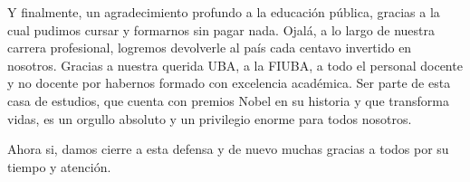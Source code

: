 Y finalmente, un agradecimiento profundo a la educación pública, gracias a la cual pudimos cursar y formarnos sin pagar nada. Ojalá, a lo largo de nuestra carrera profesional, logremos devolverle al país cada centavo invertido en nosotros. Gracias a nuestra querida UBA, a la FIUBA, a todo el personal docente y no docente por habernos formado con excelencia académica. Ser parte de esta casa de estudios, que cuenta con premios Nobel en su historia y que transforma vidas, es un orgullo absoluto y un privilegio enorme para todos nosotros. 

Ahora si, damos cierre a esta defensa y de nuevo muchas gracias a todos por su tiempo y atención.
